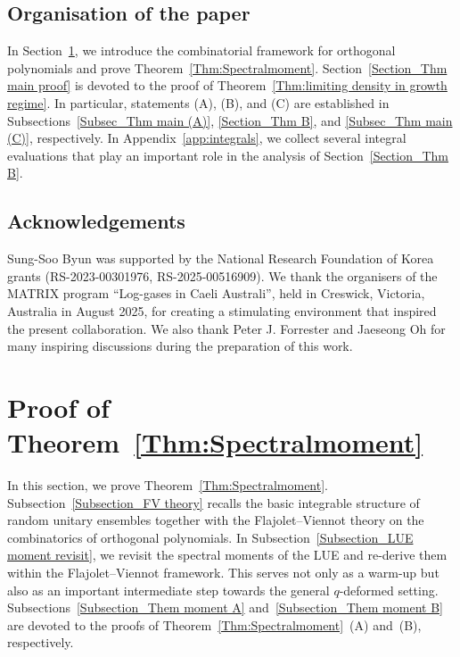 \documentclass{amsart}
\theoremstyle{plain}
\theoremstyle{remark}
\numberwithin{equation}{section}
\begin{document}
\subsection*{Organisation of the paper} In Section~\ref{Section_moments combinatorics}, we introduce the combinatorial framework for orthogonal polynomials and prove Theorem~\ref{Thm:Spectralmoment}.
Section~\ref{Section_Thm main proof} is devoted to the proof of Theorem~\ref{Thm:limiting density in growth regime}. In particular, statements (A), (B), and (C) are established in Subsections~\ref{Subsec_Thm main (A)}, \ref{Section_Thm B}, and \ref{Subsec_Thm main (C)}, respectively.
In Appendix~\ref{app:integrals}, we collect several integral evaluations that play an important role in the analysis of Section~\ref{Section_Thm B}.

 

\subsection*{Acknowledgements}
Sung-Soo Byun was supported by the National Research Foundation of Korea grants (RS-2023-00301976, RS-2025-00516909).
We thank the organisers of the MATRIX program “Log-gases in Caeli Australi”, held in Creswick, Victoria, Australia in August 2025, for creating a stimulating environment that inspired the present collaboration. We also thank Peter J. Forrester and Jaeseong Oh for many inspiring discussions during the preparation of this work.  


 







\section{Proof of Theorem~\ref{Thm:Spectralmoment}} \label{Section_moments combinatorics}

In this section, we prove Theorem~\ref{Thm:Spectralmoment}. 
Subsection~\ref{Subsection_FV theory} recalls the basic integrable structure  of random unitary ensembles together with the Flajolet--Viennot theory on the combinatorics of orthogonal polynomials. 
In Subsection~\ref{Subsection_LUE moment revisit}, we revisit the spectral
moments of the LUE and re-derive them within the Flajolet--Viennot framework.
This serves not only as a warm-up but also as an important intermediate step towards the general $q$-deformed setting. 
Subsections~\ref{Subsection_Them moment A} and~\ref{Subsection_Them moment B} are devoted to the proofs of Theorem~\ref{Thm:Spectralmoment}~(A) and~(B), respectively.
\end{document}
